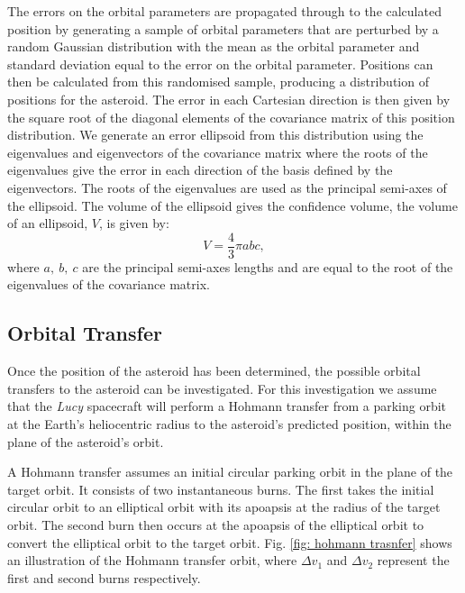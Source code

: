 \documentclass[10pt, twocolumn]{revtex4}    %
\begin{document}
The errors on the orbital parameters are propagated through to the calculated position by generating a sample of orbital parameters that are perturbed by a random Gaussian distribution with the mean as the orbital parameter and standard deviation equal to the error on the orbital parameter. Positions can then be calculated from this randomised sample, producing a distribution of positions for the asteroid. The error in each Cartesian direction is then given by the square root of the diagonal elements of the covariance matrix of this position distribution. We generate an error ellipsoid from this distribution using the eigenvalues and eigenvectors of the covariance matrix where the roots of the eigenvalues give the error in each direction of the basis defined by the eigenvectors. The roots of the eigenvalues are used as the principal semi-axes of the ellipsoid. The volume of the ellipsoid gives the confidence volume, the volume of an ellipsoid, $V$, is given by:
\begin{equation} \label{eq: v ellipsoid}
V = \frac{4}{3}\pi a b c ,
\end{equation}
where $a,\ b,\ c$ are the principal semi-axes lengths and are equal to the root of the eigenvalues of the covariance matrix.

\subsection*{Orbital Transfer}

Once the position of the asteroid has been determined, the possible orbital transfers to the asteroid can be investigated. For this investigation we assume that the \textit{Lucy} spacecraft will perform a Hohmann transfer from a parking orbit at the Earth's heliocentric radius to the asteroid's predicted position, within the plane of the asteroid's orbit. 

A Hohmann transfer assumes an initial circular parking orbit in the plane of the target orbit. It consists of two instantaneous burns. The first takes the initial circular orbit to an elliptical orbit with its apoapsis at the radius of the target orbit. The second burn then occurs at the apoapsis of the elliptical orbit to convert the elliptical orbit to the target orbit. Fig. \ref{fig: hohmann trasnfer} shows an illustration of the Hohmann transfer orbit, where $\Delta v_1$ and $\Delta v_2$ represent the first and second burns respectively.
\end{document}
